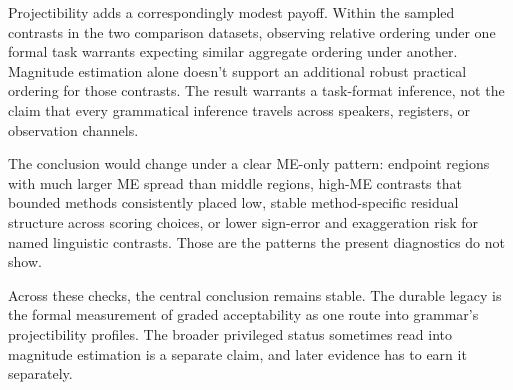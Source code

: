 Projectibility adds a correspondingly modest payoff. Within the sampled
contrasts in the two comparison datasets, observing relative ordering under one
formal task warrants expecting similar aggregate ordering under another.
Magnitude estimation alone doesn't
support an additional robust practical ordering for those contrasts. The result
warrants a task-format inference, not the claim that every grammatical inference travels
across speakers, registers, or observation channels.

The conclusion would change under a clear ME-only pattern: endpoint regions
with much larger ME spread than middle regions, high-ME contrasts that bounded
methods consistently placed low, stable method-specific residual structure
across scoring choices, or lower sign-error and exaggeration risk for named
linguistic contrasts. Those are the patterns the present diagnostics do
not show.

Across these checks, the central conclusion remains stable. The durable legacy is the formal
measurement of graded acceptability as one route into grammar's projectibility
profiles. The broader privileged status sometimes read into magnitude
estimation is a separate claim, and later evidence has to earn it separately.
